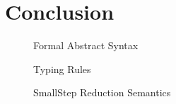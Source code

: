 \documentclass[%
draft, %
a4paper,
UKenglish,
cleveref,
autoref,
thm-restate,
pdfa
]{oasics-v2021}
\begin{document}



\section{Conclusion}
\label{sec:conclusion}

\newpage


\newpage
\appendix

\begin{figure}[ht]
  \centering
  
  \caption{\label{fig:velo:syntax}\Velo{} Formal Abstract Syntax}
\end{figure}

\begin{figure}[ht]
  \centering
  
  \caption{\label{fig:velo:statics}\Velo{} Typing Rules}
\end{figure}

\begin{figure}[ht]
  \centering
  
  \caption{\label{fig:velo:statics}\Velo{} SmallStep Reduction Semantics}
\end{figure}
\end{document}
